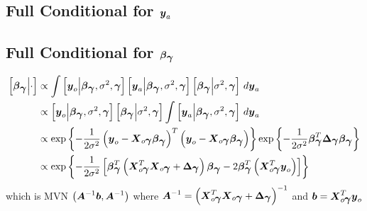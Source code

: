 \documentclass[fleqn]{article}
\def\bm#1{\mbox{\boldmath $#1$}}
\begin{document}
\subsection{Full Conditional for $\bm{y}_a$}
%
\subsection{Full Conditional for $\bm{\beta}_{\bm{\gamma}}$}
%
\begin{align*}
%
\left[ \bm{\beta}_{\bm{\gamma}} \middle| \cdot \right] & \propto \int \left[ \bm{y}_o \middle| \bm{\beta}_{\bm{\gamma}}, \sigma^2, \bm{\gamma} \right] \left[ \bm{y}_a \middle| \bm{\beta}_{\bm{\gamma}}, \sigma^2, \bm{\gamma} \right] \left[ \bm{\beta}_{\bm{\gamma}} \middle| \sigma^2, \bm{\gamma} \right] \, d \bm{y}_a \\
%
 & \propto \left[ \bm{y}_o \middle| \bm{\beta}_{\bm{\gamma}}, \sigma^2, \bm{\gamma} \right] \left[ \bm{\beta}_{\bm{\gamma}} \middle| \sigma^2, \bm{\gamma} \right] \int \left[ \bm{y}_a \middle| \bm{\beta}_{\bm{\gamma}}, \sigma^2, \bm{\gamma} \right]  \, d \bm{y}_a \\
%
 & \propto \exp{ \left\{ - \frac{1} {2 \sigma^2} \left( \bm{y}_o - \bm{X}_{o \bm{\gamma}} \bm{\beta}_{\bm{\gamma}} \right)^T \left( \bm{y}_o - \bm{X}_{o \bm{\gamma}} \bm{\beta}_{\bm{\gamma}} \right) \right\} } \exp{ \left\{ - \frac{1} {2 \sigma^2} \bm{\beta}_{\bm{\gamma}}^T \bm{\Delta}_{\bm{\gamma}} \bm{\beta}_{\bm{\gamma}} \right\} } \\
%
 & \propto \exp{ \left\{ - \frac{1} {2 \sigma^2} \left[ \bm{\beta}_{\bm{\gamma}}^T \left(\bm{X}_{o \bm{\gamma}}^T \bm{X}_{o \bm{\gamma}} + \bm{\Delta}_{\bm{\gamma}} \right) \bm{\beta}_{\bm{\gamma}} - 2 \bm{\beta}_{\bm{\gamma}}^T \left( \bm{X}_{o \bm{\gamma}}^T \bm{y}_o \right) \right] \right\} } \\
%
\end{align*}
%
which is MVN $\left( \bm{A}^{ - 1} \bm{b}, \bm{A}^{ - 1} \right)$ where $\bm{A}^{ - 1} = \left( \bm{X}_{o \bm{\gamma}}^T \bm{X}_{o \bm{\gamma}} + \bm{\Delta}_{\bm{\gamma}} \right)^{ - 1}$ and $\bm{b} = \bm{X}_{o \bm{\gamma}}^T \bm{y}_o$
%
\end{document}
